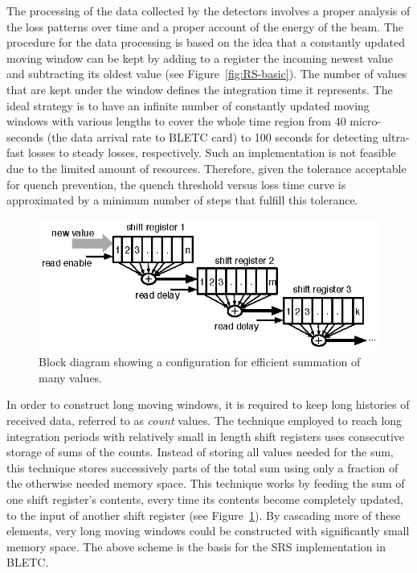 \documentclass{llncs}
\begin{document}
The processing of the data collected by the detectors involves a proper analysis of the loss patterns over time and a proper account of the energy of the beam.
The procedure for the data processing is based on the idea that a constantly updated moving window can be kept by adding to a register the incoming newest value and subtracting its oldest value (see Figure~\ref{fig:RS-basic}).
The number of values that are kept under the window defines the integration time it represents.
The ideal strategy is to have an infinite number of constantly updated moving windows with various lengths to cover the whole time region from 40 micro-seconds (the data arrival rate to BLETC card)  to 100 seconds for detecting ultra-fast losses to steady losses, respectively.
Such an implementation is not feasible due to the limited amount of resources.
Therefore, given the tolerance acceptable for quench prevention, the quench threshold versus loss time curve is approximated by a minimum number of steps that fulfill this tolerance.

\begin{figure}[t]
  \centering \includegraphics{SRS-basic.eps}
   \caption{Block diagram showing a configuration for efficient summation of many values.}
  \label{fig:SRS-basic}
\end{figure}


In order to construct long moving windows, it is required to keep long histories of received data, referred to as \emph{count} values.
The technique employed to reach long integration periods with relatively small in length shift registers uses consecutive storage of sums of the counts.
Instead of storing all values needed for the sum, this technique stores successively parts of the total sum using only a fraction of the otherwise needed memory space.
This technique works by feeding the sum of one shift register's contents, every time its contents become completely updated, to the input of another shift register (see Figure~\ref{fig:SRS-basic}).
By cascading more of these elements, very long moving windows could be constructed with significantly small memory space.
The above scheme is the basis for the SRS implementation in BLETC.
\end{document}
